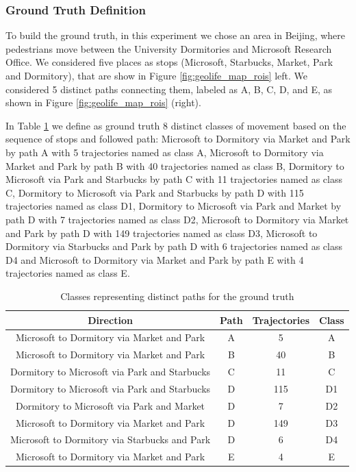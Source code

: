 \documentclass[12pt]{article}
\begin{document}
\subsubsection{Ground Truth Definition}
To build the ground truth, in this experiment we chose an area in Beijing, where pedestrians move between the University Dormitories and Microsoft Research Office. We considered five places as stops (Microsoft, Starbucks, Market, Park and Dormitory), that are show in Figure \ref{fig:geolife_map_rois} left. We considered 5 distinct paths connecting them, labeled as A, B, C, D, and E, as shown in Figure \ref{fig:geolife_map_rois} (right).

In Table \ref{tab:geolife_dataset} we define as ground truth 8 distinct classes of movement based on the sequence of stops and followed path: Microsoft to Dormitory via Market and Park by path A with 5 trajectories named as class A, Microsoft to Dormitory via Market and Park by path B with 40 trajectories named as class B, Dormitory to Microsoft via Park and Starbucks by path C with 11 trajectories named as class C, Dormitory to Microsoft via Park and Starbucks by path D with 115 trajectories named as class D1, Dormitory to Microsoft via Park and Market by path D with 7 trajectories named as class D2, Microsoft to Dormitory via Market and Park by path D with 149 trajectories named as class D3, Microsoft to Dormitory via Starbucks and Park by path D with 6 trajectories named as class D4 and Microsoft to Dormitory via Market and Park by path E with 4 trajectories named as class E.

\begin{table}[ht!]
\scriptsize
  \centering
  \begin{tabular}{|c|c|c|c|}
  	\hline
 Direction & Path &  Trajectories & Class \\
  	\hline
Microsoft to Dormitory via Market and Park& A & 5 & A \\
Microsoft to Dormitory via Market and Park& B & 40&B \\
Dormitory to Microsoft via Park and Starbucks& C & 11&C \\
Dormitory to Microsoft via Park and Starbucks& D & 115&D1 \\
Dormitory to Microsoft via Park and Market& D & 7&D2 \\
Microsoft to Dormitory via Market and Park& D & 149&D3 \\
Microsoft to Dormitory via Starbucks and Park& D & 6&D4 \\
Microsoft to Dormitory via Market and Park& E & 4& E \\
    \hline
  \end{tabular}
  \caption{Classes representing distinct paths for the ground truth}
  \label{tab:geolife_dataset}
\end{table}
\end{document}
